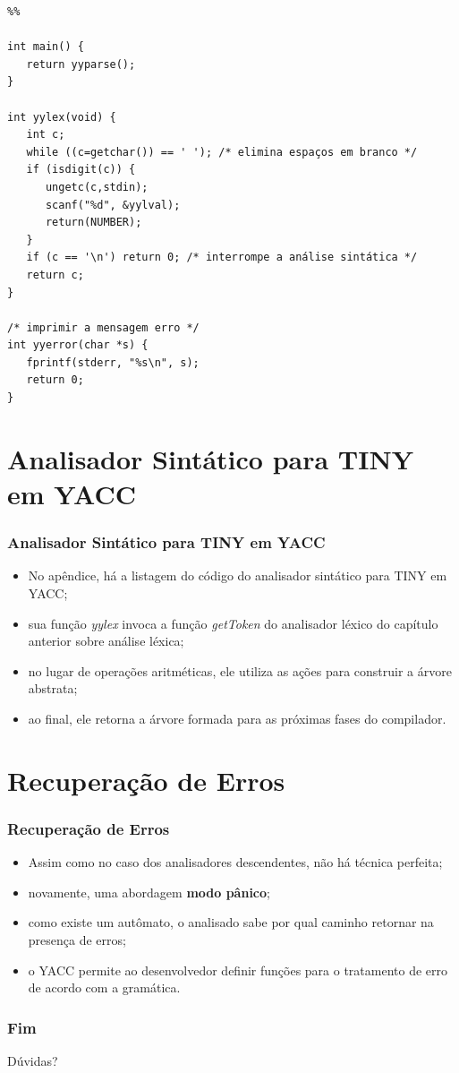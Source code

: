 \documentclass[table]{beamer}
\begin{document}
\begin{frame}[fragile]
   \scriptsize
   \begin{verbatim}
%%

int main() {
   return yyparse();
}

int yylex(void) {
   int c;
   while ((c=getchar()) == ' '); /* elimina espaços em branco */
   if (isdigit(c)) {
      ungetc(c,stdin);
      scanf("%d", &yylval);
      return(NUMBER);
   }
   if (c == '\n') return 0; /* interrompe a análise sintática */
   return c;
}

/* imprimir a mensagem erro */
int yyerror(char *s) {
   fprintf(stderr, "%s\n", s);
   return 0;
}
   \end{verbatim}

\end{frame}


\section{Analisador Sintático para TINY em YACC}
\begin{frame}
   \frametitle{Analisador Sintático para TINY em YACC}
   \begin{itemize}
      \item No apêndice, há a listagem do código do analisador sintático para TINY em YACC;
      \item sua função \textit{yylex} invoca a função \textit{getToken} do analisador léxico do capítulo anterior sobre análise léxica;
      \item no lugar de operações aritméticas, ele utiliza as ações para construir a árvore abstrata;
      \item ao final, ele retorna a árvore formada para as próximas fases do compilador.
   \end{itemize}
\end{frame}

\section{Recuperação de Erros}
\begin{frame}
   \frametitle{Recuperação de Erros}
   \begin{itemize}
      \item Assim como no caso dos analisadores descendentes, não há técnica perfeita;
      \item novamente, uma abordagem \textbf{modo pânico};
      \item como existe um autômato, o analisado sabe por qual caminho retornar na presença de erros;
      \item o YACC permite ao desenvolvedor definir funções para o tratamento de erro de acordo com a gramática.
   \end{itemize}
\end{frame}

\begin{frame}
   \frametitle{Fim}
   Dúvidas?
\end{frame}
\end{document}
